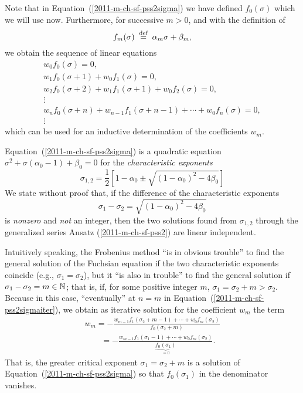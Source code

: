 Note that in  Equation~(\ref{2011-m-ch-sf-pss2sigma}) we have defined $f_0(\sigma )$ which we will use now.
Furthermore, for successive $m>0$, and with the definition of
\begin{equation}
f_m(\sigma ) \stackrel{{\tiny \textrm{ def }}}{=} \alpha_m \sigma +\beta_m,
\end{equation}
we obtain the sequence of linear equations
\begin{equation}
\begin{split}
w_0f_0(\sigma ) =0,\\
w_1f_0(\sigma +1)+w_0f_1(\sigma )  =0,\\
w_2f_0(\sigma +2)+w_1f_1(\sigma +1) +w_0f_2(\sigma )  =0,\\
\vdots   \quad    \\
w_nf_0(\sigma+ n)   +w_{n-1}f_1(\sigma+ n-1)+ \cdots +w_0f_n(\sigma )  =0, \\
\vdots \quad
\end{split}
\label{2011-m-ch-sf-pss2sigmaiter}
\end{equation}
which can be used for an inductive determination of the coefficients $w_m$.

Equation~(\ref{2011-m-ch-sf-pss2sigma}) is a quadratic equation
$   \sigma^2 +\sigma (\alpha_{0}-1 ) +  \beta_{0}  =0$
for the
{\em characteristic exponents}
\begin{equation}
\sigma_{1,2} = \frac{1}{2} \left[1 - \alpha_{0} \pm \sqrt{(1 - \alpha_{0})^2-4  \beta_{0}}\right]
\end{equation}
We state without proof that, if the difference of the characteristic exponents
\begin{equation}
\sigma_1 - \sigma_2  =   \sqrt{(1 - \alpha_{0})^2-4  \beta_{0}}
\end{equation}
is  {\em nonzero} and {\em not} an integer, then the two solutions found from   $\sigma_{1,2}$
through  the generalized series Ansatz  (\ref{2011-m-ch-sf-pss2}) are linear independent.

Intuitively speaking, the Frobenius method ``is in obvious trouble'' to find
the general solution of the Fuchsian equation
if the two characteristic exponents coincide (e.g., $\sigma_1 = \sigma_2$),
but it ``is also in trouble'' to find
the general solution
if  $\sigma_1 - \sigma_2 = m \in {\Bbb N}$;
that is, if, for some positive integer $m$,  $\sigma_1  = \sigma_2 + m > \sigma_2$.
Because in this case, ``eventually''
at $n=m$ in Equation~(\ref{2011-m-ch-sf-pss2sigmaiter}),
we obtain as iterative solution for the coefficient $w_m$ the term
\begin{equation}
\begin{split}
w_m  = - \frac{w_{m-1}f_1(\sigma_2 + m-1)+ \cdots +w_0f_m(\sigma_2  )}{f_0(\sigma_2 + m)}
\\
\qquad  = - \frac{w_{m-1}f_1(\sigma_1-1)+ \cdots +w_0f_m(\sigma_2  )}{\underbrace{f_0(\sigma_1)}_{ = 0}}
.
\end{split}
\end{equation}
That is,  the greater critical exponent $\sigma_1=\sigma_2 + m$   is a solution
of Equation~(\ref{2011-m-ch-sf-pss2sigma}) so that $f_0(\sigma_1)$ in the denominator vanishes.

